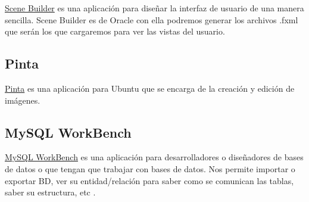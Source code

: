 \href{http://www.oracle.com/technetwork/java/javase/downloads/javafxscenebuilder-info-2157684.html}{Scene Builder} es una aplicación para diseñar la interfaz de usuario de una manera sencilla. Scene Builder es de Oracle con ella podremos generar los archivos .fxml que serán los que cargaremos para ver las vistas del usuario.

\subsection{Pinta}\label{pinta}

\href{https://pinta-project.com/pintaproject/pinta/}{Pinta} es una aplicación para Ubuntu que se encarga de la creación y edición de imágenes.

\subsection{MySQL WorkBench}\label{pinta}

\href{https://pinta-project.com/pintaproject/pinta/}{MySQL WorkBench} es una aplicación para desarrolladores o diseñadores de bases de datos o que tengan que trabajar con bases de datos. Nos permite importar o exportar BD, ver su entidad/relación para saber como se comunican las tablas, saber su estructura, etc \cite{web:worckbench}.
